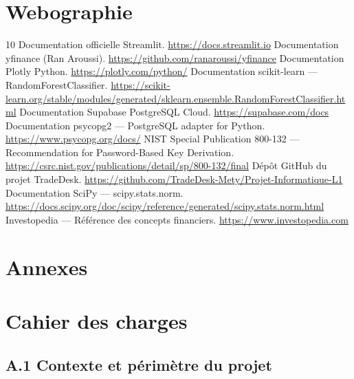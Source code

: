 \documentclass[a4paper, 12pt, twoside]{article}
\begin{document}
\newpage

\section{Webographie}
\renewcommand{\refname}{}
\begin{thebibliography}{10}
     Documentation officielle Streamlit.
        \url{https://docs.streamlit.io}
     Documentation yfinance (Ran Aroussi).
        \url{https://github.com/ranaroussi/yfinance}
     Documentation Plotly Python.
        \url{https://plotly.com/python/}
     Documentation scikit-learn --- RandomForestClassifier.
        \url{https://scikit-learn.org/stable/modules/generated/sklearn.ensemble.RandomForestClassifier.html}
     Documentation Supabase PostgreSQL Cloud.
        \url{https://supabase.com/docs}
     Documentation psycopg2 --- PostgreSQL adapter for Python.
        \url{https://www.psycopg.org/docs/}
     NIST Special Publication 800-132 --- Recommendation
        for Password-Based Key Derivation.
        \url{https://csrc.nist.gov/publications/detail/sp/800-132/final}
     Dépôt GitHub du projet TradeDesk.
        \url{https://github.com/TradeDesk-Mety/Projet-Informatique-L1}
     Documentation SciPy --- scipy.stats.norm.
        \url{https://docs.scipy.org/doc/scipy/reference/generated/scipy.stats.norm.html}
     Investopedia --- Référence des concepts financiers.
        \url{https://www.investopedia.com}
\end{thebibliography}

\newpage

\section{Annexes}
\appendix
\makeatletter
\def\@seccntformat#1{Annexe~\csname the#1\endcsname~:\quad}
\makeatother

    \section{Cahier des charges}

    \subsection*{A.1 Contexte et périmètre du projet}
\end{document}
